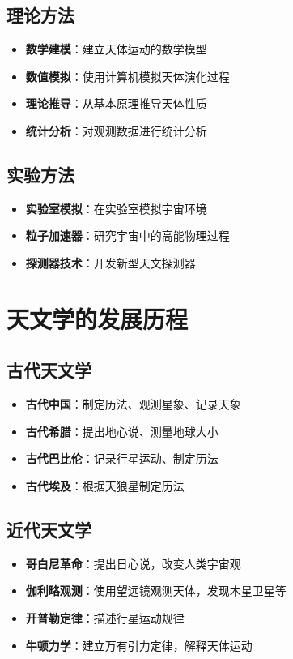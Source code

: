 \documentclass[12pt,UTF8]{ctexbook}
\begin{document}
\subsection{理论方法}

\begin{itemize}
  \item \textbf{数学建模}：建立天体运动的数学模型
  \item \textbf{数值模拟}：使用计算机模拟天体演化过程
  \item \textbf{理论推导}：从基本原理推导天体性质
  \item \textbf{统计分析}：对观测数据进行统计分析
\end{itemize}

\subsection{实验方法}

\begin{itemize}
  \item \textbf{实验室模拟}：在实验室模拟宇宙环境
  \item \textbf{粒子加速器}：研究宇宙中的高能物理过程
  \item \textbf{探测器技术}：开发新型天文探测器
\end{itemize}

\section{天文学的发展历程}

\subsection{古代天文学}

\begin{itemize}
  \item \textbf{古代中国}：制定历法、观测星象、记录天象
  \item \textbf{古代希腊}：提出地心说、测量地球大小
  \item \textbf{古代巴比伦}：记录行星运动、制定历法
  \item \textbf{古代埃及}：根据天狼星制定历法
\end{itemize}

\subsection{近代天文学}

\begin{itemize}
  \item \textbf{哥白尼革命}：提出日心说，改变人类宇宙观
  \item \textbf{伽利略观测}：使用望远镜观测天体，发现木星卫星等
  \item \textbf{开普勒定律}：描述行星运动规律
  \item \textbf{牛顿力学}：建立万有引力定律，解释天体运动
\end{itemize}
\end{document}
